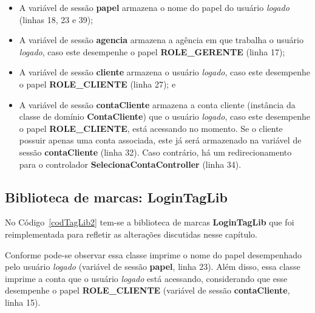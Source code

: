 \begin{itemize}

\item A variável de sessão {\bf papel}  armazena o nome do papel do usuário {\it
  logado} (linhas 18, 23 e 39); 

\vspace{0.5cm}

\item A  variável de sessão {\bf agencia}  armazena a agência em  que trabalha o
  usuário {\it logado}, caso este  desempenhe o papel {\bf ROLE\_GERENTE} (linha
  17); 

\vspace{0.5cm}

\item A variável  de sessão {\bf cliente} armazena o  usuário {\it logado}, caso
  este desempenhe o papel {\bf ROLE\_CLIENTE} (linha 27); e 

\vspace{0.5cm}

\item  A  variável  de  sessão  {\bf  contaCliente}  armazena  a  conta  cliente
  (instância  da  classe de  domínio  {\bf  ContaCliente})  que o  usuário  {\it
  logado}, caso este  desempenhe o papel {\bf ROLE\_CLIENTE},  está acessando no
  momento.  Se  o cliente  possuir  apenas uma  conta  associada,  este já  será
  armazenado  na  variável  de  sessão  {\bf  contaCliente}  (linha  32).   Caso
  contrário,    há    um    redirecionamento    para    o    controlador    {\bf
    SelecionaContaController} (linha 34).  

\end{itemize}

\subsection{Biblioteca de marcas: LoginTagLib}

\vspace{0.5cm}

No Código~\ref{codTagLib2}  tem-se a biblioteca de marcas  {\bf LoginTagLib} que
foi reimplementada para refletir as alterações discutidas nesse capítulo.  

Conforme pode-se observar essa classe  imprime o nome do papel desempenhado pelo
usuário {\it  logado} (variável de sessão  {\bf papel}, linha  23).  Além disso,
essa  classe  imprime  a  conta  que  o usuário  {\it  logado}  está  acessando,
considerando que esse desempenhe o papel {\bf ROLE\_CLIENTE} (variável de sessão
{\bf contaCliente}, linha 15).  

